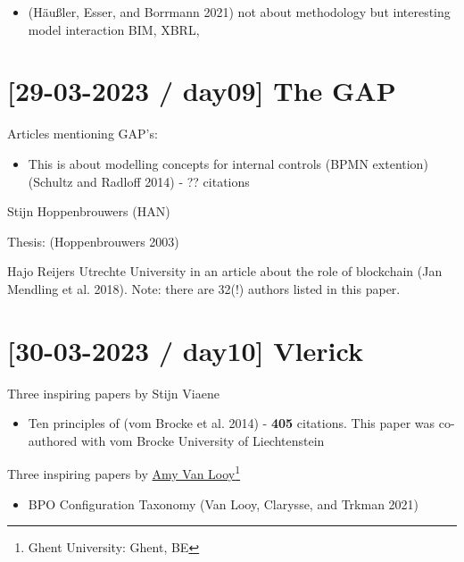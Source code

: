\documentclass[
  letterpaper,
  DIV=11,
  numbers=noendperiod]{scrreprt}
\providecommand{\tightlist}{%
  \setlength{\itemsep}{0pt}\setlength{\parskip}{0pt}}\usepackage{longtable,booktabs,array}
\begin{document}
\begin{itemize}
\tightlist
\item
  (Häußler, Esser, and Borrmann 2021) not about methodology but
  interesting model interaction BIM, XBRL,
\end{itemize}

\hypertarget{day09-the-gap}{%
\section{{[}29-03-2023 / day09{]} The GAP}\label{day09-the-gap}}

Articles mentioning GAP's:

\begin{itemize}
\tightlist
\item
  This is about modelling concepts for internal controls
  (BPMN extention)(Schultz and Radloff 2014) - ?? citations
\end{itemize}

Stijn
Hoppenbrouwers
(HAN)

Thesis: (Hoppenbrouwers 2003)

Hajo Reijers Utrechte University in an article about the role of
blockchain (Jan Mendling et al. 2018). Note: there are 32(!) authors
listed in this paper.

\hypertarget{day10-vlerick}{%
\section{{[}30-03-2023 / day10{]} Vlerick}\label{day10-vlerick}}

Three inspiring papers by Stijn
Viaene

\begin{itemize}
\tightlist
\item
  Ten principles of (vom Brocke et al. 2014) - \textbf{405} citations.
  This paper was co-authored with vom
  Brocke
  University of Liechtenstein
\end{itemize}

Three inspiring papers by \href{https://www.amyvanlooy.eu/home}{Amy Van
Looy}\footnote{Ghent
  University: Ghent, BE}

\begin{itemize}
\tightlist
\item
  BPO Configuration Taxonomy (Van Looy, Clarysse, and Trkman 2021)
\end{itemize}
\end{document}
